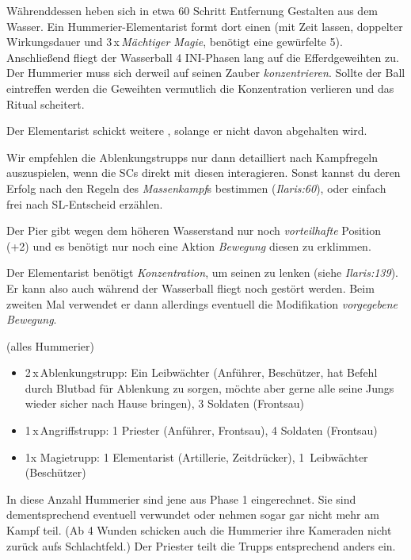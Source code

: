 Währenddessen heben sich in etwa 60 Schritt Entfernung Gestalten aus dem Wasser. Ein Hummerier-Elementarist formt dort einen  (mit Zeit lassen, doppelter Wirkungsdauer und 3\,x\,\textit{Mächtiger Magie}, benötigt eine gewürfelte 5). Anschließend fliegt der Wasserball 4 INI-Phasen lang auf die Efferdgeweihten zu.
Der Hummerier muss sich derweil auf seinen Zauber \textit{konzentrieren}.
Sollte der Ball eintreffen werden die Geweihten vermutlich die Konzentration verlieren und das Ritual scheitert.

Der Elementarist schickt weitere , solange er nicht davon abgehalten wird.

\smallskip

Wir empfehlen die Ablenkungstrupps nur dann detailliert nach Kampfregeln auszuspielen, wenn die SCs direkt mit diesen interagieren.
Sonst kannst du deren Erfolg nach den Regeln des \textit{Massenkampf}s bestimmen (\textit{Ilaris:60}), oder einfach frei nach SL-Entscheid erzählen.


Der Pier gibt wegen dem höheren Wasserstand nur noch \textit{vorteilhafte} Position (+2) und es benötigt nur noch eine Aktion \textit{Bewegung} diesen zu erklimmen.

Der Elementarist benötigt \textit{Konzentration}, um seinen  zu lenken (siehe \textit{Ilaris:139}).
Er kann also auch während der Wasserball fliegt noch gestört werden.
Beim zweiten Mal verwendet er dann allerdings eventuell die Modifikation \textit{vorgegebene Bewegung}.

 (alles Hummerier)
\begin{itemize}
\item 2\,x\,Ablenkungstrupp: Ein Leibwächter (Anführer, Beschützer, hat Befehl durch Blutbad für Ablenkung zu sorgen, möchte aber gerne alle seine Jungs wieder sicher nach Hause bringen), 3 Soldaten (Frontsau)
\item 1\,x\,Angriffstrupp: 1 Priester (Anführer, Frontsau), 4 Soldaten (Frontsau)
\item 1x Magietrupp: 1 Elementarist (Artillerie, Zeitdrücker), 1~Leibwächter (Beschützer)
\end{itemize}

In diese Anzahl Hummerier sind jene aus Phase 1 eingerechnet. Sie sind dementsprechend eventuell verwundet oder nehmen sogar gar nicht mehr am Kampf teil. (Ab 4 Wunden schicken auch die Hummerier ihre Kameraden nicht zurück aufs Schlachtfeld.) Der Priester teilt die Trupps entsprechend anders ein.


